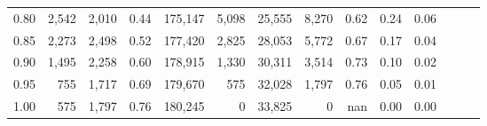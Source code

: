 \begin{tabular}{rrrrrrrrrrrrrr}
0.80 &   2,542 &  2,010 &  0.44 &  175,147 &    5,098 &  25,555 &   8,270 &  0.62 &  0.24 &      0.06 \\
0.85 &   2,273 &  2,498 &  0.52 &  177,420 &    2,825 &  28,053 &   5,772 &  0.67 &  0.17 &      0.04 \\
0.90 &   1,495 &  2,258 &  0.60 &  178,915 &    1,330 &  30,311 &   3,514 &  0.73 &  0.10 &      0.02 \\
0.95 &     755 &  1,717 &  0.69 &  179,670 &      575 &  32,028 &   1,797 &  0.76 &  0.05 &      0.01 \\
1.00 &     575 &  1,797 &  0.76 &  180,245 &        0 &  33,825 &       0 &   nan &  0.00 &      0.00 \\
\bottomrule
\end{tabular}
